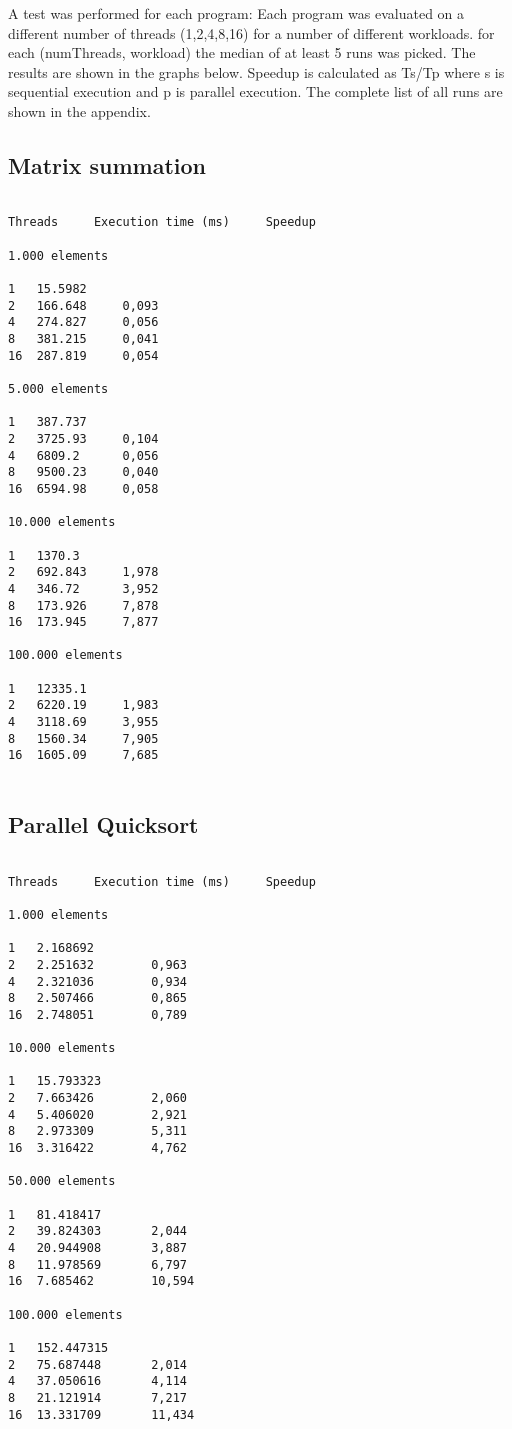 \documentclass{article}
\begin{document}
A test was performed for each program: Each program was evaluated on a different number of threads (1,2,4,8,16) for a number of different workloads. for each (numThreads, workload) the median of at least 5 runs was picked. The results are shown in the graphs below. Speedup is calculated as Ts/Tp where s is sequential execution and p is parallel execution. The complete list of all runs are shown in the appendix.

\subsection{Matrix summation}
\begin{verbatim}

Threads     Execution time (ms)     Speedup

1.000 elements 

1   15.5982 	 	     
2   166.648     0,093       
4   274.827     0,056
8   381.215     0,041
16  287.819     0,054
      
5.000 elements

1   387.737	   
2   3725.93     0,104
4   6809.2      0,056    
8   9500.23     0,040   
16  6594.98     0,058   

10.000 elements

1   1370.3   
2   692.843     1,978
4   346.72      3,952   
8   173.926     7,878  
16  173.945     7,877

100.000 elements

1   12335.1		       
2   6220.19     1,983       
4   3118.69     3,955      
8   1560.34     7,905       
16  1605.09     7,685      


\end{verbatim}

\subsection{Parallel Quicksort}

\begin{verbatim}

Threads     Execution time (ms)     Speedup

1.000 elements

1   2.168692			
2   2.251632        0,963
4   2.321036        0,934		
8   2.507466        0,865 
16  2.748051        0,789

10.000 elements

1   15.793323 
2   7.663426        2,060 
4   5.406020        2,921	 
8   2.973309        5,311 
16  3.316422        4,762

50.000 elements

1   81.418417	 
2   39.824303       2,044  
4   20.944908       3,887	 
8   11.978569       6,797	 
16  7.685462        10,594 
 
100.000 elements

1   152.447315
2   75.687448       2,014
4   37.050616       4,114
8   21.121914       7,217	
16  13.331709       11,434

\end{verbatim}
\end{document}
